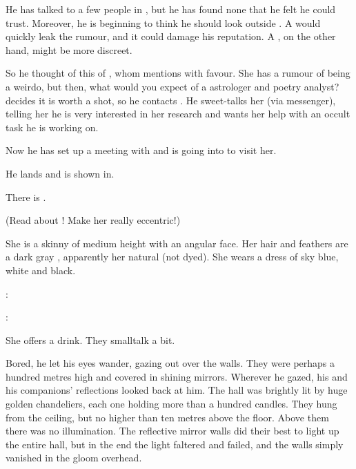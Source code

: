He has talked to a few people in \CiriathSepher, but he has found none that he felt he could trust. 
Moreover, he is beginning to think he should look outside \CiriathSepher. 
A \CiriathSepher would quickly leak the rumour, and it could damage his reputation. 
A \TiphredSerah, on the other hand, might be more discreet. 

So he thought of this \Urizeth of \TiphredSerah, whom \Lothagiel mentions with favour. 
She has a rumour of being a weirdo, but then, what would you expect of a \TiphredSerah astrologer and poetry analyst? 
\Teshrial decides it is worth a shot, so he contacts \Urizeth. 
He sweet-talks her (via messenger), telling her he is very interested in her research and wants her help with an occult task he is working on. 

Now he has set up a meeting with \Urizeth and is going into \TiphredSerah to visit her. 

\begin{comment}
  \section{Teshrial meets Urizeth}
\end{comment}

He lands and is shown in. 

There is \Urizeth. 

(Read about \Urizeth! Make her really eccentric!)

She is a skinny \resvil of medium height with an angular face. 
Her hair and feathers are a dark gray \colour, apparently her natural \colour (not dyed). 
She wears a dress of sky blue, white and black. 

\Urizeth: 

\Teshrial: 

She offers a drink. 
They smalltalk a bit. 

Bored, he let his eyes wander, gazing out over the walls. 
They were perhaps a hundred metres high and covered in shining mirrors. 
Wherever he gazed, his and his companions' reflections looked back at him. 
The hall was brightly lit by huge golden chandeliers, each one holding more than a hundred candles. 
They hung from the ceiling, but no higher than ten metres above the floor. 
Above them there was no illumination. 
The reflective mirror walls did their best to light up the entire hall, but in the end the light faltered and failed, and the walls simply vanished in the gloom overhead. 

